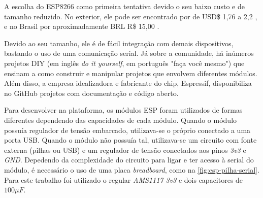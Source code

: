 \begin{table}[htb]
\end{table}


A escolha do ESP8266 como primeira tentativa devido o seu baixo custo e de
tamanho reduzido. No exterior, ele pode ser encontrado por de USD\$ 1,76 a 2,2
\cite{AlibabaESP}, e no Brasil por aproximadamente BRL R\$ 15,00 \cite{mercadolivreEsp}.

Devido ao seu tamanho, ele é de fácil integração com demais dispositivos,
bastando o uso de uma comunicação serial. Já sobre a comunidade, há inúmeros
projetos DIY (em inglês \emph{do it yourself}, em português "faça você mesmo")
que ensinam a como construir e manipular projetos que envolvem diferentes
módulos. Além disso, a empresa  idealizadora e fabricante do chip, Espressif,
disponibiliza no GitHub projetos com documentação e código aberto.

Para desenvolver na plataforma, os módulos ESP foram utilizados de formas
diferentes dependendo das capacidades de cada módulo. Quando o módulo possuía
regulador de tensão embarcado, utilizava-se o próprio conectado a uma porta USB.
Quando o módulo não possuía tal, utilizava-se um circuito com fonte externa
(pilhas ou USB) e um regulador de tensão conectados aos pinos \emph{3v3} e
\emph{GND}. Depedendo da complexidade do circuito para ligar e ter acesso à
serial do módulo, é necessário o uso de uma placa \emph{breadboard}, como na
\autoref{fig:esp-pilha-serial}. Para este trabalho foi utilizado o regular
\emph{AMS1117 3v3} e dois capacitores de $100 \mu F$.


